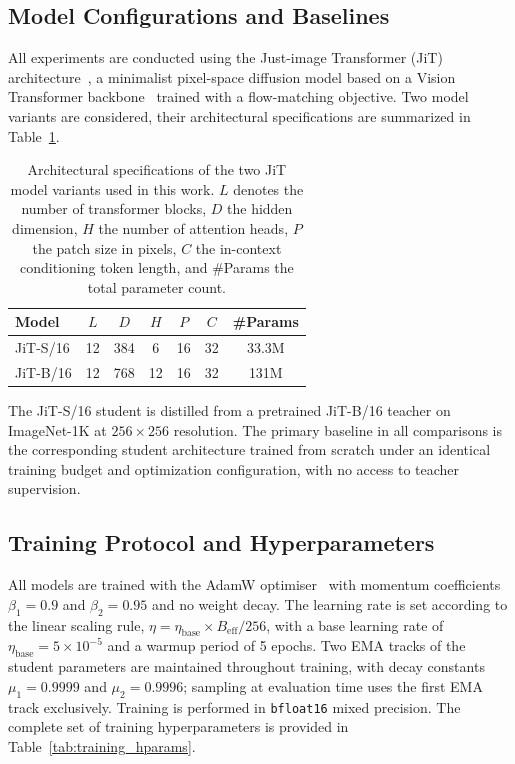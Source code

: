 \subsection*{Model Configurations and Baselines}
\label{subsec:models}

All experiments are conducted using the Just-image Transformer (JiT)
architecture~\cite{li2025jit}, a minimalist pixel-space diffusion model based
on a Vision Transformer backbone~\cite{dosovitskiy2020image} trained with a
flow-matching objective. Two model variants are considered, their architectural specifications are
summarized in Table~\ref{tab:model_configs}.

\begin{table}[ht]
    \centering
    \caption{Architectural specifications of the two JiT model variants used
    in this work. $L$ denotes the number of transformer blocks, $D$ the hidden
    dimension, $H$ the number of attention heads, $P$ the patch size in pixels,
    $C$ the in-context conditioning token length, and \#Params the total
    parameter count.}
    \label{tab:model_configs}
    \begin{tabular}{lcccccc}
        \toprule
        Model & $L$ & $D$ & $H$ & $P$ & $C$ & \#Params \\
        \midrule
        JiT-S/16 & 12 & 384 &  6 & 16 & 32 & 33.3M \\
        JiT-B/16 & 12 & 768 & 12 & 16 & 32 & 131M \\
        \bottomrule
    \end{tabular}
\end{table}

The JiT-S/16 student is distilled from a pretrained
JiT-B/16 teacher on ImageNet-1K at $256 \times 256$ resolution. The primary baseline in all comparisons is the
corresponding student architecture trained from scratch under an identical
training budget and optimization configuration, with no access to teacher
supervision.

\subsection*{Training Protocol and Hyperparameters}
\label{subsec:training}

All models are trained with the AdamW optimiser~\cite{loshchilov2017decoupled}
with momentum coefficients $\beta_1 = 0.9$ and $\beta_2 = 0.95$ and no weight
decay. The learning rate is set according to the linear scaling rule,
$\eta = \eta_\text{base} \times B_\text{eff} / 256$, with a base learning
rate of $\eta_\text{base} = 5 \times 10^{-5}$ and a warmup period of 5 epochs.
Two EMA tracks of the student parameters are maintained throughout training,
with decay constants $\mu_1 = 0.9999$ and $\mu_2 = 0.9996$; sampling at
evaluation time uses the first EMA track exclusively. Training is performed
in \texttt{bfloat16} mixed precision. The complete set of training
hyperparameters is provided in
Table~\ref{tab:training_hparams}.

